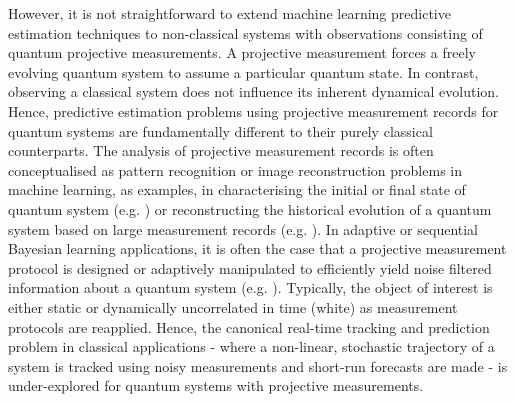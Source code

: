 However, it is not straightforward to extend machine learning predictive estimation techniques to non-classical systems with observations consisting of quantum projective measurements. A projective measurement forces a freely evolving quantum system to assume a particular quantum state. In contrast, observing a classical system does not influence its inherent dynamical evolution. Hence, predictive estimation problems using projective measurement records for quantum systems are fundamentally different to their purely classical counterparts. The analysis of projective measurement records is often conceptualised as pattern recognition or image reconstruction problems in machine learning, as examples, in characterising the initial or final state of quantum system (e.g. \cite{struchalin2016experimental, sergeevich2011characterization, mahler2013adaptive}) or reconstructing the historical evolution of a quantum system based on large measurement records (e.g. \cite{stenberg2016characterization, shabani2011efficient, shen2014reconstructing, de2016estimation, tan2015prediction, huang2017neural}). In adaptive or sequential Bayesian learning applications, it is often the case that a projective measurement protocol is designed or adaptively manipulated to efficiently yield noise filtered information about a quantum system (e.g. \cite{bonato2016optimized, wiebe2015bayesian}). Typically, the object of interest is either static or dynamically uncorrelated in time (white) as  measurement protocols are reapplied. Hence, the canonical real-time tracking and prediction problem in classical applications - where a non-linear, stochastic trajectory of a system is tracked using noisy measurements and short-run forecasts are made - is under-explored for quantum systems with projective measurements.
\\ 
\\

